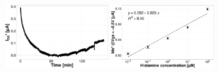 \begin{figure}
    \centering
    \includegraphics[width = 0.4\textwidth]{figures/chapter4/histamine/correctedPlot-chronoamperometry.pdf}
    \quad
    \includegraphics[width = 0.4\textwidth]{figures/chapter4/histamine/calibrationPlot-chronoamperometry.pdf}
    \caption{}
    \label{fig:HisChrono}
\end{figure}

